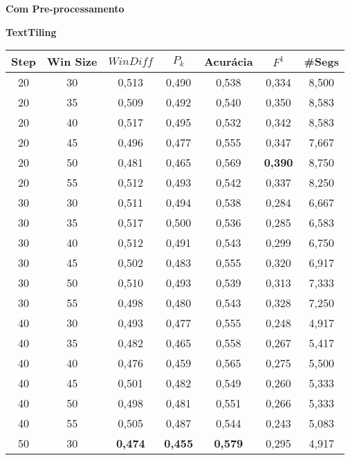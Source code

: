 \documentclass{article}
\begin{document}
 
\small

\pagestyle{empty}

{  
\Large
\center
	\textbf{Com Pre-processamento}  

}

{  
\large
\center
	\textbf{TextTiling}  

}

\begin{longtable}[c]{|c|c|c|c|c|c|c|} 
\hline 

 Step & Win Size & $WinDiff$ & $P_k$ & Acurácia & $F^1$ & \#Segs\\ \hline 
 20 & 30 & 0,513 & 0,490 & 0,538 & 0,334 & 8,500  \\ \hline 
 20 & 35 & 0,509 & 0,492 & 0,540 & 0,350 & 8,583  \\ \hline 
 20 & 40 & 0,517 & 0,495 & 0,532 & 0,342 & 8,583  \\ \hline 
 20 & 45 & 0,496 & 0,477 & 0,555 & 0,347 & 7,667  \\ \hline 
 20 & 50 & 0,481 & 0,465 & 0,569 & \cellcolor{gray!20} \textbf{0,390} & 8,750  \\ \hline 
 20 & 55 & 0,512 & 0,493 & 0,542 & 0,337 & 8,250  \\ \hline 
 30 & 30 & 0,511 & 0,494 & 0,538 & 0,284 & 6,667  \\ \hline 
 30 & 35 & 0,517 & 0,500 & 0,536 & 0,285 & 6,583  \\ \hline 
 30 & 40 & 0,512 & 0,491 & 0,543 & 0,299 & 6,750  \\ \hline 
 30 & 45 & 0,502 & 0,483 & 0,555 & 0,320 & 6,917  \\ \hline 
 30 & 50 & 0,510 & 0,493 & 0,539 & 0,313 & 7,333  \\ \hline 
 30 & 55 & 0,498 & 0,480 & 0,543 & 0,328 & 7,250  \\ \hline 
 40 & 30 & 0,493 & 0,477 & 0,555 & 0,248 & 4,917  \\ \hline 
 40 & 35 & 0,482 & 0,465 & 0,558 & 0,267 & 5,417  \\ \hline 
 40 & 40 & 0,476 & 0,459 & 0,565 & 0,275 & 5,500  \\ \hline 
 40 & 45 & 0,501 & 0,482 & 0,549 & 0,260 & 5,333  \\ \hline 
 40 & 50 & 0,498 & 0,481 & 0,551 & 0,266 & 5,333  \\ \hline 
 40 & 55 & 0,505 & 0,487 & 0,544 & 0,243 & 5,083  \\ \hline 
 50 & 30 & \cellcolor{gray!20} \textbf{0,474} & \cellcolor{gray!20} \textbf{0,455} & \cellcolor{gray!20} \textbf{0,579} & 0,295 & 4,917  \\ \hline 

\end{longtable}
\end{document}
